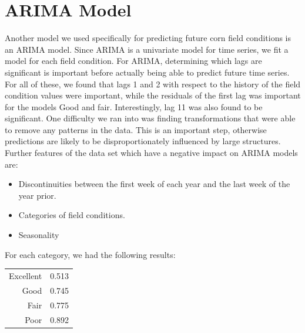 \documentclass[a4paper]{apa6}
\begin{document}
\section*{ARIMA Model}
Another model we used specifically for predicting future corn field conditions is an ARIMA model. Since ARIMA is a univariate model for time series, we fit a model for each field condition.	 For ARIMA, determining which lags are significant is important before actually being able to predict future time series. For all of these, we found that lags 1 and 2 with respect to the history of the field condition values were important, while the residuals of the first lag was important for the models Good and fair. Interestingly, lag 11 was also found to be significant. One difficulty we ran into was finding transformations that were able to remove any patterns in the data. This is an important step, otherwise predictions are likely to be disproportionately influenced by large structures.  Further features of the data set which have a negative impact on ARIMA models are:
\begin{itemize}
\item Discontinuities between the first week of each year and the last week of the year prior.
\item Categories of field conditions.
\item Seasonality
\end{itemize}

For each category, we had the following results:
\begin{center}
\begin{tabular}{|r|l|}
  \hline
Excellent & 0.513 \\
Good & 0.745\\
Fair & 0.775\\
Poor & 0.892\\
  \hline
\end{tabular}
\end{center}
\end{document}
